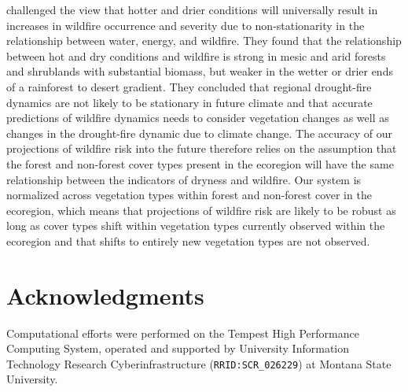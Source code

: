 \documentclass[11p]{article}
\begin{document}
\citet{mckenzieClimateChangeEcohydrology2017} challenged the view that hotter and drier conditions will universally result in increases in wildfire occurrence and severity due to non-stationarity in the relationship between water, energy, and wildfire. They found that the relationship between hot and dry conditions and wildfire is strong in mesic and arid forests and shrublands with substantial biomass, but weaker in the wetter or drier ends of a rainforest to desert gradient. They concluded that regional drought-fire dynamics are not likely to be stationary in future climate and that accurate predictions of wildfire dynamics needs to consider vegetation changes  as well as changes in the drought-fire dynamic due to climate change. The accuracy of our projections of wildfire risk into the future therefore relies on the assumption that the forest and non-forest cover types present in the ecoregion will have the same relationship between the indicators of dryness and wildfire. Our system is normalized across vegetation types within forest and non-forest cover in the ecoregion, which means that projections of wildfire risk are likely to be robust as long as cover types shift within vegetation types currently observed within the ecoregion and that shifts to entirely new vegetation types are not observed.




\section{Acknowledgments}

Computational efforts were performed on the Tempest High Performance Computing System, operated and supported by University Information Technology Research Cyberinfrastructure (\texttt{RRID:SCR\_026229}) at Montana State University.

\clearpage

\printbibliography[
heading=bibintoc,
title={References}
]
\end{document}
